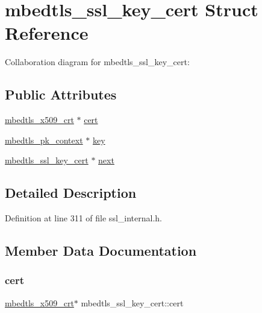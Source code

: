 \hypertarget{structmbedtls__ssl__key__cert}{}\section{mbedtls\+\_\+ssl\+\_\+key\+\_\+cert Struct Reference}
\label{structmbedtls__ssl__key__cert}


Collaboration diagram for mbedtls\+\_\+ssl\+\_\+key\+\_\+cert\+:
\subsection*{Public Attributes}
\begin{DoxyCompactItemize}
\item 
\mbox{\hyperlink{structmbedtls__x509__crt}{mbedtls\+\_\+x509\+\_\+crt}} $\ast$ \mbox{\hyperlink{structmbedtls__ssl__key__cert_a85f7a889f740577ad11cd50adbef09a8}{cert}}
\item 
\mbox{\hyperlink{structmbedtls__pk__context}{mbedtls\+\_\+pk\+\_\+context}} $\ast$ \mbox{\hyperlink{structmbedtls__ssl__key__cert_a36357248c58a208bf8e820b75f2f118f}{key}}
\item 
\mbox{\hyperlink{structmbedtls__ssl__key__cert}{mbedtls\+\_\+ssl\+\_\+key\+\_\+cert}} $\ast$ \mbox{\hyperlink{structmbedtls__ssl__key__cert_ac8969b0a63df001f997cab96154db160}{next}}
\end{DoxyCompactItemize}


\subsection{Detailed Description}


Definition at line 311 of file ssl\+\_\+internal.\+h.



\subsection{Member Data Documentation}
\mbox{\label{structmbedtls__ssl__key__cert_a85f7a889f740577ad11cd50adbef09a8}} 
\subsubsection{\texorpdfstring{cert}{cert}}
{\footnotesize\ttfamily \mbox{\hyperlink{structmbedtls__x509__crt}{mbedtls\+\_\+x509\+\_\+crt}}$\ast$ mbedtls\+\_\+ssl\+\_\+key\+\_\+cert\+::cert}

